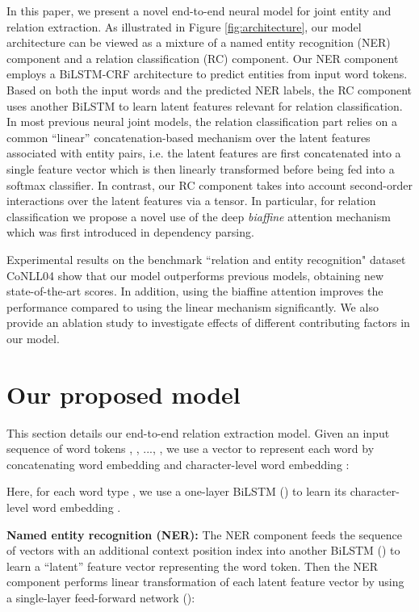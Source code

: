 \documentclass[runningheads]{llncs}
\begin{document}
In this paper, we present a novel end-to-end neural  model for joint entity and relation extraction. As illustrated in Figure \ref{fig:architecture}, our model architecture can be viewed as a mixture of a named entity recognition (NER) component  and a relation classification  (RC) component. Our NER component employs a  BiLSTM-CRF architecture  \cite{HuangXY15} to predict entities from input word tokens. Based on both the input words  and the predicted NER labels, the RC component uses another BiLSTM to learn latent features relevant for relation classification. 
In most previous neural joint models, the  relation classification part relies on a common ``linear'' concatenation-based  mechanism over the latent features associated with entity  pairs, i.e. the latent features are first concatenated into a single feature vector which is then linearly transformed before being fed into a softmax classifier.   In contrast, our RC component takes  into account second-order interactions over the latent features via a tensor. In particular,  for relation classification we propose a novel use of  the  deep \textit{biaffine} attention mechanism \cite{DozatM17}  which was first introduced in  dependency parsing.  


Experimental results on the benchmark ``relation and entity recognition"   dataset CoNLL04 \cite{roth-yih:2004:CONLL} show that our model outperforms previous models, obtaining new state-of-the-art scores. In addition, 
using  the {biaffine} attention improves  the performance compared to using the linear mechanism significantly. We also provide an  ablation study to investigate effects of different contributing factors in our  model.


\section{Our proposed model}

This section details  our end-to-end relation extraction model. 
Given an input  sequence of  word tokens , , ..., , we use a vector  to represent each  word  by concatenating word embedding  and character-level word embedding :

 

Here, for each word type , we use a one-layer BiLSTM ()  to learn its  character-level word embedding  \cite{ballesteros-dyer-smith:2015:EMNLP}. 

\medskip

\noindent\textbf{Named entity recognition (NER):} The NER component feeds the  sequence of vectors  with an additional context position index  into another BiLSTM ()  to learn a ``latent'' feature vector  representing the  word token.
Then the  NER component performs linear transformation of  each latent feature vector  by using a single-layer feed-forward  network ():
\end{document}
